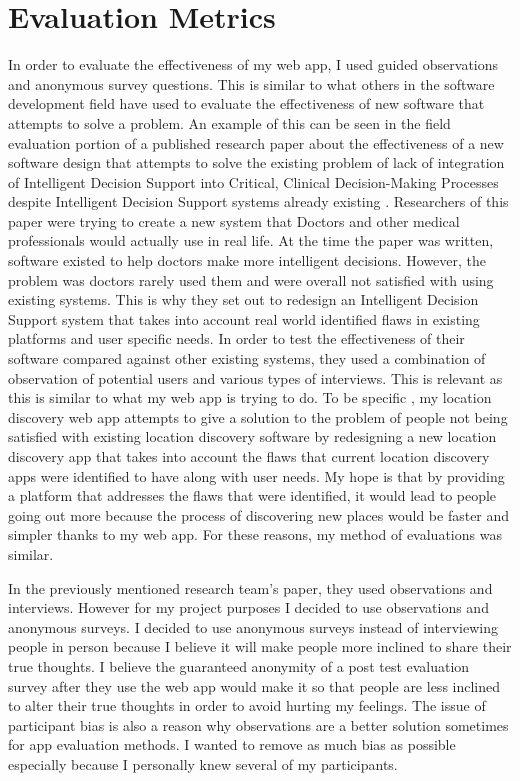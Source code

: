 \documentclass[12pt,twocolumn]{article}
\begin{document}
\section{Evaluation Metrics}
In order to evaluate the effectiveness of my web app, I used guided observations and anonymous survey questions. This is similar to what others in the software development field  have used to evaluate the effectiveness of new software that attempts to solve a problem. An example of this can be seen in the field evaluation portion of a published research paper about the effectiveness of a new software design that attempts to solve the existing problem of lack of integration of  Intelligent Decision Support into Critical, Clinical Decision-Making Processes despite Intelligent Decision Support systems already existing \cite{unremarkableAI}. Researchers of this paper were trying to create a new system that Doctors and other medical professionals would actually use in real life. At the time the paper was written, software existed to help doctors make more intelligent decisions. However, the problem was doctors rarely used them and were overall not satisfied with using existing systems. This is why they set out to redesign an Intelligent Decision Support system that takes into account real world identified flaws in existing platforms and user specific needs. In order to test the effectiveness of their software compared against other existing systems, they used a combination of observation of potential users and various types of interviews. This is relevant as this is similar to what my web app is trying to do. To be specific , my location discovery web app attempts to give a solution to the problem of people not being satisfied with existing location discovery software by redesigning a new location discovery app that takes into account the flaws that current location discovery apps were identified to have along with user needs. My hope is that by providing a platform that addresses the flaws that were identified, it  would lead to people going out more because the process of discovering new places would be faster and simpler thanks to my web app.  For these reasons, my method of evaluations was similar. 

In the previously mentioned research team’s paper, they used observations and interviews. However for my project purposes I decided to use observations and anonymous surveys. I decided to use anonymous surveys instead of interviewing people in person because I believe it will make people more inclined to share their true thoughts. I believe the guaranteed anonymity of a post test evaluation survey after they use the web app would make it so that people are less inclined to alter their true thoughts in order to avoid hurting my feelings. The issue of participant bias is also a reason why observations are a better solution sometimes for app evaluation methods. I wanted to remove as much bias as possible especially because I personally knew several of my participants.  
\end{document}

